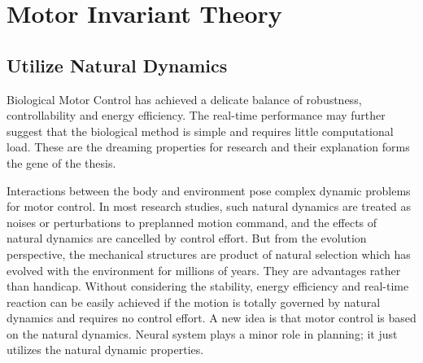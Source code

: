 %

\section{Motor Invariant Theory}
\subsection{Utilize Natural Dynamics}
Biological Motor Control has achieved a delicate balance of robustness, controllability and energy efficiency.
The real-time performance may further suggest that the biological method  is simple and requires little computational load.
These are the dreaming properties for \cms research and  their explanation  forms the gene of the thesis.



Interactions between the body and environment pose  complex dynamic problems for motor control.
In most \cms research studies, such natural dynamics are treated as noises or perturbations to preplanned motion command, and the  effects  of natural dynamics are cancelled by control effort.
But from the evolution perspective, the mechanical structures are product of natural selection which has evolved with the environment for millions of years. 
They are advantages rather than handicap. 
Without considering the stability, energy efficiency and real-time reaction can be easily achieved if the motion is totally governed by natural dynamics and requires no control effort.
A new idea is that motor control is based on the natural dynamics.
Neural system plays a minor role in planning; it just utilizes the natural dynamic properties.

